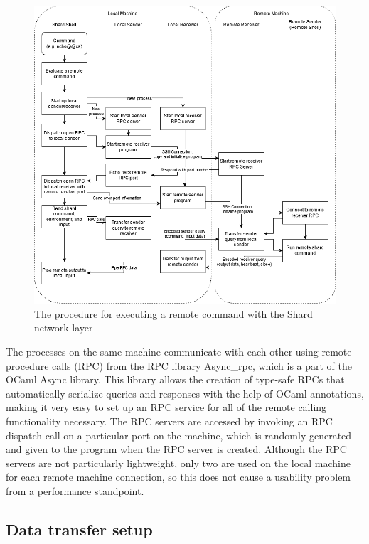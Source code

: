 \documentclass[twoside]{report}
\begin{document}
\begin{figure}[h]
  \begin{center}
    \includegraphics[scale=0.5]{img/shard_protocol_impl.png}
    \caption{The procedure for executing a remote command with the Shard network layer}
    \label{fig:network_layer_impl}
  \end{center}
\end{figure}

The processes on the same machine communicate with each other using remote procedure calls (RPC) from the RPC library Async\_rpc, which is a part of the OCaml Async library.
This library allows the creation of type-safe RPCs that automatically serialize queries and responses with the help of OCaml annotations, making it very easy to set up an RPC service for all of the remote calling functionality necessary.
The RPC servers are accessed by invoking an RPC dispatch call on a particular port on the machine, which is randomly generated and given to the program when the RPC server is created.
Although the RPC servers are not particularly lightweight, only two are used on the local machine for each remote machine connection, so this does not cause a usability problem from a performance standpoint.

\subsection{Data transfer setup}
\end{document}
